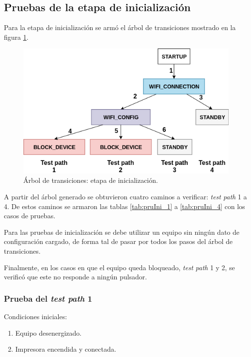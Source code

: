 \subsection{Pruebas de la etapa de inicialización}

Para la etapa de inicialización se armó el árbol de transiciones mostrado en la figura \ref{fig:ArTrans_1}.

\begin{figure}[htpb]
	\centering
	\includegraphics[scale=1]{./Figures/ArTrans_1.png}
	\caption{Árbol de transiciones: etapa de inicialización.}
	\label{fig:ArTrans_1}
\end{figure}

A partir del árbol generado se obtuvieron cuatro caminos a verificar: \textit{test path} 1 a 4. De estos caminos se armaron las tablas \ref{tab:pruIni_1} a \ref{tab:pruIni_4} con los casos de pruebas.

Para las pruebas de inicialización se debe utilizar un equipo sin ningún dato de configuración cargado, de forma tal de pasar por todos los pasos del árbol de transiciones.

Finalmente, en los casos en que el equipo queda bloqueado, \textit{test path} 1 y 2, se verificó que este no responde a ningún pulsador.

\subsubsection{Prueba del \textit{test path} 1}
\label{subsubsec:pruIni_1}

Condiciones iniciales: 

\begin{enumerate}
	\item Equipo desenergizado.
	\item Impresora encendida y conectada.
\end{enumerate}

